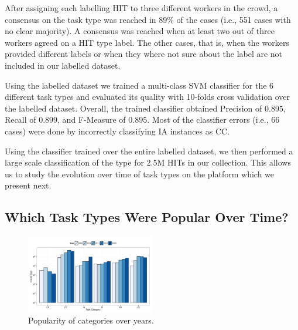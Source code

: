 After assigning each labelling HIT to three different workers in the crowd, a consensus on the task type was reached in $89\%$ of the cases (i.e., 551 cases with no clear majority). A consensus was reached when at least two out of three workers agreed on a HIT type label. The other cases, that is, when the workers provided different labels or when they where not sure about the label are not included in our labelled dataset.

Using the labelled dataset we trained a multi-class SVM classifier for the 6 different task types and evaluated its quality with 10-folds cross validation over the labelled dataset. Overall, the trained classifier obtained Precision of $0.895$, Recall of $0.899$, and F-Measure of $0.895$. Most of the classifier errors (i.e., 66 cases) were done by incorrectly classifying IA instances as CC.

Using the classifier trained over the entire labelled dataset, we then performed a large scale classification of the type for 2.5M HITs in our collection. This allows us to study the evolution over time of task types on the \amt platform which we present next.

\subsection{Which Task Types Were Popular Over Time?}

\begin{figure}[htbp]
	\centering
		\includegraphics[width=0.5\textwidth]{figures/category_trends}
	\caption{Popularity of categories over years.}
	\label{fig:cat_trends}
\end{figure}

